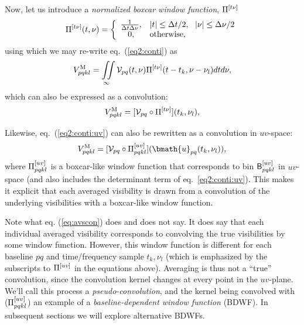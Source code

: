 \documentclass[useAMS,usenatbib]{mn2e}
\begin{document}
Now, let us introduce a \emph{normalized boxcar window function}, $\Pi^{[t\nu]}$ 
\begin{equation}
\Pi^{[t\nu]}(t,\nu) = \bigg \{ \begin{array}{cl}
\frac{1}{\Delta t\Delta\nu}, &  |t|\leq\Delta t/2,~~|\nu|\leq\Delta\nu/2 \\
0, & \mathrm{otherwise},
\end{array}
\end{equation}
using which we may re-write eq.~(\ref{eq2:conti}) as
\begin{equation}
V^\mathrm{M}_{pqkl} =  
\iint\limits_{\infty}
\mathcal{V}_{pq}(t,\nu) \Pi^{[t\nu]}(t-t_k,\nu-\nu_l) dtd\nu,
\end{equation}
which can also be expressed as a convolution:
\begin{equation}
V^\mathrm{M}_{pqkl} = [ \mathcal{V}_{pq} \circ \Pi^{[t\nu]} ](t_k,\nu_l),
\end{equation}

Likewise, eq.~(\ref{eq2:conti:uv}) can also be rewritten as a convolution in $uv$-space:
\begin{equation}
\Vm_{pqkl} = [ \VV_{pq} \circ \Puv_{pqkl} ](\bmath{u}_{pq}(t_k,\nu_l)),
\label{eq:avscon}
\end{equation}
where $\Pi^{[uv]}_{pqkl}$ is a boxcar-like window function that corresponds to bin $\mathsf{B}^{[uv]}_{pqkl}$ in $uv$-space 
(and also includes the determinant term of eq.~\ref{eq2:conti:uv}). This makes it explicit that each averaged 
visibility is drawn from a convolution of the underlying visibilities with a boxcar-like window function.

Note what eq. (\ref{eq:avscon}) does and does not say. It does say that each individual averaged visibility corresponds to 
convolving the true visibilities by some window function. However, this window function is different for each baseline $pq$ and 
time/frequency sample $t_k,\nu_l$ (which is emphasized by the subscripts to $\Pi^{[uv]}$ in the equations above). Averaging 
is thus not a ``true'' convolution, since the convolution kernel changes at every point in the $uv$-plane. We'll call this 
process a \emph{pseudo-convolution}, and the kernel being convolved with ($\Pi^{[uv]}_{pqkl}$) an example of a 
\emph{baseline-dependent window function} (BDWF). In subsequent sections we will explore alternative BDWFs.
\end{document}
